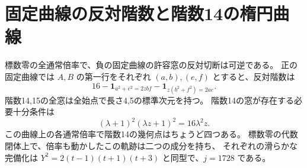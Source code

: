 \section{固定曲線の反対階数と階数14の楕円曲線}
\label{sec:fixed-opposite-rank-drop}
\begin{theorem}\label{thm:fixed-opposite-rank-drop}
標数零の全通常倍率で、負の固定曲線の許容窓の反対切断は可逆である。
正の固定曲線では $A,B$ の第一行をそれぞれ $(a,b),(e,f)$ とすると、反対階数は
\[
 16-\boldsymbol{1}_{a^2+e^2=2zbf}-\boldsymbol{1}_{z(b^2+f^2)=2ae}.
\]
階数14,15の全窓は全始点で長さ4,5の標準次元を持つ。
階数14の窓が存在する必要十分条件は
\[
             (\lambda+1)^2(\lambda z+1)^2=16\lambda^2 z .
\]
この曲線上の各通常倍率で階数14の幾何点はちょうど四つある。
標数零の代数閉体上で、倍率も動かしたこの軌跡は二つの成分を持ち、
それぞれの滑らかな完備化は $Y^2=2(t-1)(t+1)(t+3)$ と同型で、$j=1728$ である。
\end{theorem}
